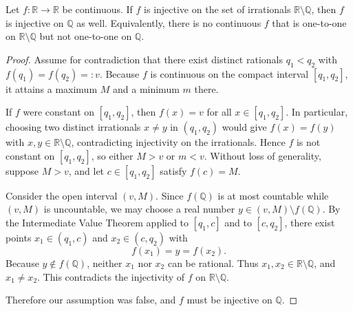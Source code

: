 \begin{exercise}
Let $f:\mathbb{R}\to\mathbb{R}$ be continuous. If $f$ is injective on the set
of irrationals $\mathbb{R}\setminus\mathbb{Q}$, then $f$ is injective on $\mathbb{Q}$ as well.
Equivalently, there is no continuous $f$ that is one-to-one on $\mathbb{R}\setminus\mathbb{Q}$
but not one-to-one on $\mathbb{Q}$.
\end{exercise}

\begin{proof}
Assume for contradiction that there exist distinct rationals $q_1<q_2$ with
$f(q_1)=f(q_2)=:v$. Because $f$ is continuous on the compact interval $[q_1,q_2]$,
it attains a maximum $M$ and a minimum $m$ there.

If $f$ were constant on $[q_1,q_2]$, then $f(x)=v$ for all $x\in[q_1,q_2]$.
In particular, choosing two distinct irrationals $x\neq y$ in $(q_1,q_2)$ would give
$f(x)=f(y)$ with $x,y\in\mathbb{R}\setminus\mathbb{Q}$, contradicting injectivity on
the irrationals. Hence $f$ is not constant on $[q_1,q_2]$, so either $M>v$ or $m<v$.
Without loss of generality, suppose $M>v$, and let $c\in[q_1,q_2]$ satisfy $f(c)=M$.

Consider the open interval $(v,M)$. Since $f(\mathbb{Q})$ is at most countable while $(v,M)$
is uncountable, we may choose a real number $y\in(v,M)\setminus f(\mathbb{Q})$.
By the Intermediate Value Theorem applied to $[q_1,c]$ and to $[c,q_2]$, there exist points
$x_1\in(q_1,c)$ and $x_2\in(c,q_2)$ with
\[
f(x_1)=y=f(x_2).
\]
Because $y\notin f(\mathbb{Q})$, neither $x_1$ nor $x_2$ can be rational.
Thus $x_1,x_2\in\mathbb{R}\setminus\mathbb{Q}$, and $x_1\neq x_2$.
This contradicts the injectivity of $f$ on $\mathbb{R}\setminus\mathbb{Q}$.

Therefore our assumption was false, and $f$ must be injective on $\mathbb{Q}$.
\end{proof}

